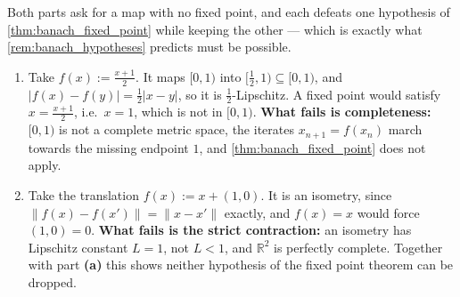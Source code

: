 \begin{exercisesolution}
Both parts ask for a map with no fixed point, and each defeats one hypothesis of
\cref{thm:banach_fixed_point} while keeping the other --- which is exactly what
\cref{rem:banach_hypotheses} predicts must be possible.
\begin{enumerate}[label=\textbf{(\alph*)}]
  \item Take $f(x) := \tfrac{x+1}{2}$. It maps $[0,1)$ into $[\tfrac12,1) \subseteq [0,1)$, and
    $|f(x)-f(y)| = \tfrac12|x-y|$, so it is $\tfrac12$-Lipschitz. A fixed point would satisfy
    $x = \tfrac{x+1}{2}$, i.e.\ $x = 1$, which is not in $[0,1)$. \textbf{What fails is
    completeness:} $[0,1)$ is not a complete metric space, the iterates
    $x_{n+1} = f(x_n)$ march towards the missing endpoint $1$, and \cref{thm:banach_fixed_point}
    does not apply.
  \item Take the translation $f(x) := x + (1,0)$. It is an isometry, since
    $\|f(x)-f(x')\| = \|x-x'\|$ exactly, and $f(x) = x$ would force $(1,0) = 0$. \textbf{What
    fails is the strict contraction:} an isometry has Lipschitz constant $L = 1$, not $L < 1$,
    and $\mathbb{R}^2$ is perfectly complete. Together with part \textbf{(a)} this shows neither
    hypothesis of the fixed point theorem can be dropped.
\end{enumerate}
\end{exercisesolution}

